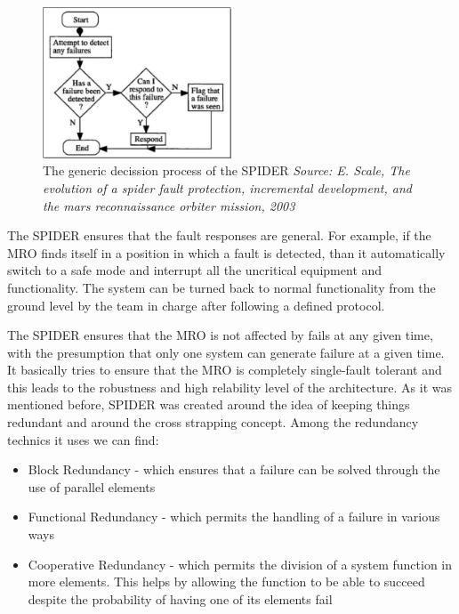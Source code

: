 \begin{figure}[htb]
	\begin{center}
	\includegraphics[width=0.5\textwidth]{img/spider.png}
	\caption{The generic decission process of the SPIDER\small{\textit{ Source: E.
	Scale, The evolution of a spider fault protection, incremental development, and
	the mars reconnaissance orbiter mission, 2003}}}
	\label{fig:spider}
	\end{center}
\end{figure}


The SPIDER ensures that the fault responses are general. For example, if the MRO
finds itself in a position in which a fault is detected, than it automatically
switch to a safe mode and interrupt all the uncritical equipment and
functionality. The system can be turned back to normal functionality from the
ground level by the team in charge after following a defined protocol.

The SPIDER ensures that the MRO is not affected by fails at any given time, with
the presumption that only one system can generate failure at a given time. It
basically tries to ensure that the MRO is completely single-fault tolerant and
this leads to the robustness and high relability level of the architecture. As
it was mentioned before, SPIDER was created around the idea of keeping things
redundant and around the cross strapping concept. Among the redundancy technics
it uses we can find:
\begin{itemize}
\item Block Redundancy - which ensures that a failure can be solved through the
use of parallel elements
\item Functional Redundancy - which permits the handling of a failure in various
ways
\item Cooperative Redundancy - which permits the division of a system function
in more elements. This helps by allowing the function to be able to succeed despite
the probability of having one of its elements fail
\end{itemize}

